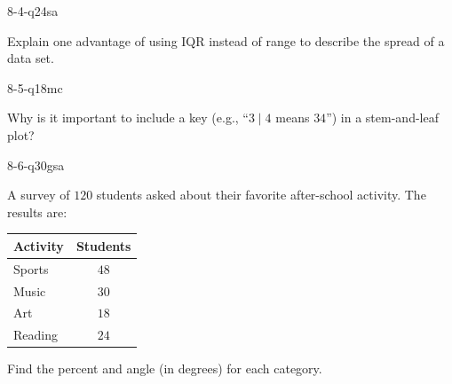 \begin{practiceQuestion}{8-4-q24}{sa}
\begin{questionText}
Explain one advantage of using IQR instead of range to describe the spread of a data set.
\end{questionText}
\end{practiceQuestion}

\begin{practiceQuestion}{8-5-q18}{mc}
\begin{questionText}
Why is it important to include a key (e.g., ``$3 \mid 4$ means $34$'') in a stem-and-leaf plot?
\end{questionText}
\end{practiceQuestion}

\begin{practiceQuestion}{8-6-q30}{gsa}
\begin{questionText}
A survey of $120$ students asked about their favorite after-school activity. The results are:

\begin{center}
\begin{tabular}{|l|c|}
\hline
\textbf{Activity} & \textbf{Students} \\
\hline
Sports & $48$ \\
\hline
Music & $30$ \\
\hline
Art & $18$ \\
\hline
Reading & $24$ \\
\hline
\end{tabular}
\end{center}

Find the percent and angle (in degrees) for each category.
\end{questionText}
\end{practiceQuestion}

